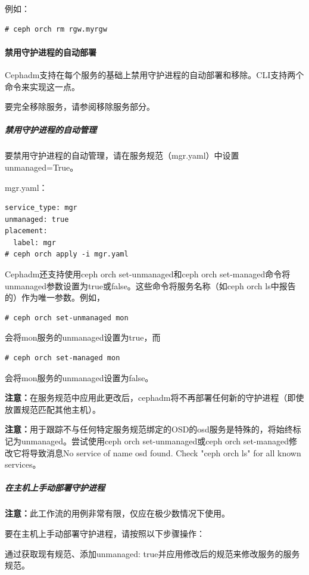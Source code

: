 \documentclass[12pt,UTF8]{ctexbook}
\begin{document}
例如：

\begin{verbatim}
# ceph orch rm rgw.myrgw
\end{verbatim}

\paragraph{禁用守护进程的自动部署}

Cephadm支持在每个服务的基础上禁用守护进程的自动部署和移除。CLI支持两个命令来实现这一点。

要完全移除服务，请参阅移除服务部分。

\subparagraph{禁用守护进程的自动管理}

要禁用守护进程的自动管理，请在服务规范（mgr.yaml）中设置unmanaged=True。

mgr.yaml：

\begin{verbatim}
service_type: mgr
unmanaged: true
placement:
  label: mgr
# ceph orch apply -i mgr.yaml
\end{verbatim}

Cephadm还支持使用ceph orch set-unmanaged和ceph orch set-managed命令将unmanaged参数设置为true或false。这些命令将服务名称（如ceph orch ls中报告的）作为唯一参数。例如，

\begin{verbatim}
# ceph orch set-unmanaged mon
\end{verbatim}

会将mon服务的unmanaged设置为true，而

\begin{verbatim}
# ceph orch set-managed mon
\end{verbatim}

会将mon服务的unmanaged设置为false。

\textbf{注意：}在服务规范中应用此更改后，cephadm将不再部署任何新的守护进程（即使放置规范匹配其他主机）。

\textbf{注意：}用于跟踪不与任何特定服务规范绑定的OSD的osd服务是特殊的，将始终标记为unmanaged。尝试使用ceph orch set-unmanaged或ceph orch set-managed修改它将导致消息No service of name osd found. Check "ceph orch ls" for all known services。

\subparagraph{在主机上手动部署守护进程}

\textbf{注意：}此工作流的用例非常有限，仅应在极少数情况下使用。

要在主机上手动部署守护进程，请按照以下步骤操作：

通过获取现有规范、添加unmanaged: true并应用修改后的规范来修改服务的服务规范。
\end{document}
